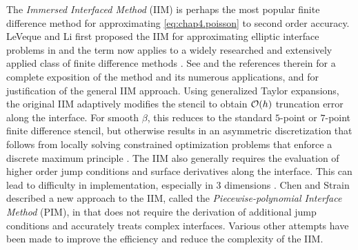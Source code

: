 The \emph{Immersed Interfaced Method} (IIM) is perhaps the most popular finite difference method for approximating \eqref{eq:chap4.poisson} to second order accuracy. LeVeque and Li first proposed the IIM for approximating elliptic interface problems in \cite{Leveque94} and the term now applies to a widely researched and extensively applied class of finite difference methods \cite{Leveque97, Li.Zhilin01b, Lee.Long03, Le.DV06, Xu.Sheng06, Tan.Zhijun08, Xu.Sheng08}. See \cite{Li.Zhilin06a} and the references therein for a complete exposition of the method and its numerous applications, and \cite{Beale06} for justification of the general IIM approach. Using generalized Taylor expansions, the original IIM adaptively modifies the stencil to obtain $\mathcal{O}(h)$ truncation error along the interface. For smooth $\beta$, this reduces to the standard $5$-point or $7$-point finite difference stencil, but otherwise results in an asymmetric discretization that follows from locally solving constrained optimization problems that enforce a discrete maximum principle \cite{Li.Zhilin01a}. The IIM also generally requires the evaluation of higher order jump conditions and surface derivatives along the interface. This can lead to difficulty in implementation, especially in $3$ dimensions \cite{Deng03, Li.Zhilin06a, Xu.Sheng06, Xu.Sheng08}. Chen and Strain described a new approach to the IIM, called the \emph{Piecewise-polynomial Interface Method} (PIM), in \cite{Chen08} that does not require the derivation of additional jump conditions and accurately treats complex interfaces. Various other attempts have been made \cite{Li.Zhilin98a, Weigmann00, Berthelsen04, Adams.Loyce02, Adams.Loyce04, Adams.Loyce05, Li.Zhilin06a} to improve the efficiency and reduce the complexity of the IIM.


